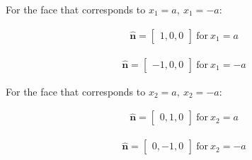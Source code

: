 \begin{problem}
\begin{enumerate}
        For the face that corresponds to \(x_{1}=a,\ x_{1}=-a  \):


\begin{align}
\mathbf{\hat{n}}=\begin{bmatrix}
1,0,0
\end{bmatrix} \ \text{for} \ x_{1}=a
\end{align}

\begin{align}
\mathbf{\hat{n}}=\begin{bmatrix}
-1,0,0
\end{bmatrix} \ \text{for} \ x_{1}=-a
\end{align}



        
        For the face that corresponds to \(x_{2}=a,\ x_{2}=-a  \):


\begin{align}
\mathbf{\hat{n}}=\begin{bmatrix}
0,1,0
\end{bmatrix} \ \text{for} \ x_{2}=a
\end{align}

\begin{align}
\mathbf{\hat{n}}=\begin{bmatrix}
0,-1,0
\end{bmatrix} \ \text{for} \ x_{2}=-a
\end{align}




\end{enumerate}
\end{problem}

